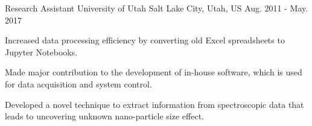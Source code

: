 \begin{cventries}

\cventry
{Research Assistant}
{University of Utah}
{Salt Lake City, Utah, US}
{Aug. 2011 - May. 2017}
{
\begin{cvitems}
\item {Increased data processing efficiency by converting old Excel spreadsheets
    to Jupyter Notebooks.}
\item {Made major contribution to the development of in-house software, which is used
    for data acquisition and system control.}
\item {Developed a novel technique to extract information from spectroscopic
    data that leads to uncovering unknown nano-particle size effect.}
\end{cvitems}
}


\end{cventries}